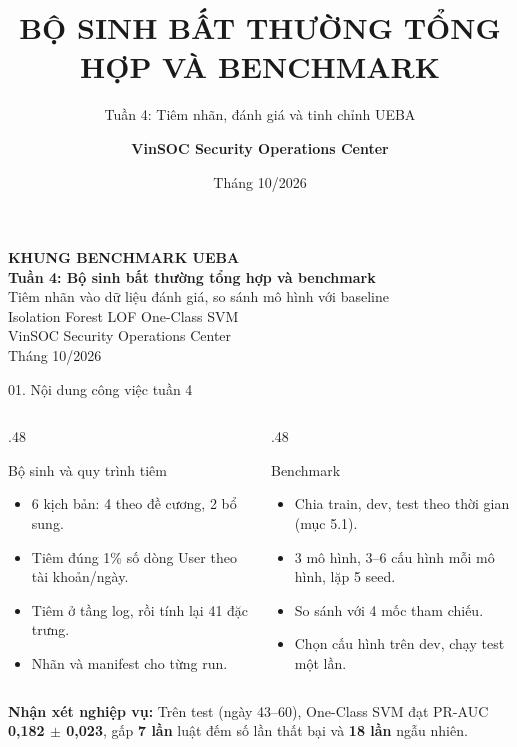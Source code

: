 \documentclass[aspectratio=169, 10pt]{beamer}
\title{BỘ SINH BẤT THƯỜNG TỔNG HỢP VÀ BENCHMARK}
\subtitle{Tuần 4: Tiêm nhãn, đánh giá và tinh chỉnh UEBA}
\author{\textbf{VinSOC Security Operations Center}}
\institute{Trung Tâm Vận Hành An Ninh Mạng VinSOC}
\date{Tháng 10/2026}
\newcommand{\nhanxet}[1]{%
  \vspace{0.12em}%
  \begin{tcolorbox}[
    enhanced,
    colback=socsky!6,
    colframe=socsky,
    boxrule=0pt,
    leftrule=3pt,
    arc=1mm,
    left=6pt, right=6pt, top=3pt, bottom=3pt,
    fontupper=\scriptsize
  ]
    \textbf{\color{socsky!90!black}Nhận xét nghiệp vụ:} #1
  \end{tcolorbox}%
}
\begin{document}
\begin{frame}[plain]
\begin{center}
{\LARGE\bfseries\color{socblue}KHUNG BENCHMARK UEBA}\\[.6em]
{\large\bfseries\color{socteal}Tuần 4: Bộ sinh bất thường tổng hợp và benchmark}\\[.7em]
{\normalsize Tiêm nhãn vào dữ liệu đánh giá, so sánh mô hình với baseline}\\[1em]
{\small Isolation Forest \quad LOF \quad One-Class SVM}\\[1.5em]
{\small VinSOC Security Operations Center}\\[.4em]
{\footnotesize Tháng 10/2026}
\end{center}
\end{frame}

\begin{frame}{01. Nội dung công việc tuần 4}
\begin{columns}[T,onlytextwidth]
\begin{column}{.48\textwidth}
\begin{block}{Bộ sinh và quy trình tiêm}
\begin{itemize}\setlength\itemsep{7pt}
\item 6 kịch bản: 4 theo đề cương, 2 bổ sung.
\item Tiêm đúng 1\% số dòng User theo tài khoản/ngày.
\item Tiêm ở tầng log, rồi tính lại 41 đặc trưng.
\item Nhãn và manifest cho từng run.
\end{itemize}
\end{block}
\end{column}
\begin{column}{.48\textwidth}
\begin{exampleblock}{Benchmark}
\begin{itemize}\setlength\itemsep{7pt}
\item Chia train, dev, test theo thời gian (mục 5.1).
\item 3 mô hình, 3--6 cấu hình mỗi mô hình, lặp 5 seed.
\item So sánh với 4 mốc tham chiếu.
\item Chọn cấu hình trên dev, chạy test một lần.
\end{itemize}
\end{exampleblock}
\end{column}
\end{columns}
\vspace{.8em}
\nhanxet{Trên test (ngày 43--60), One-Class SVM đạt PR-AUC \textbf{0,182 $\pm$ 0,023}, gấp \textbf{7 lần} luật đếm số lần thất bại và \textbf{18 lần} ngẫu nhiên.}
\end{frame}
\end{document}
